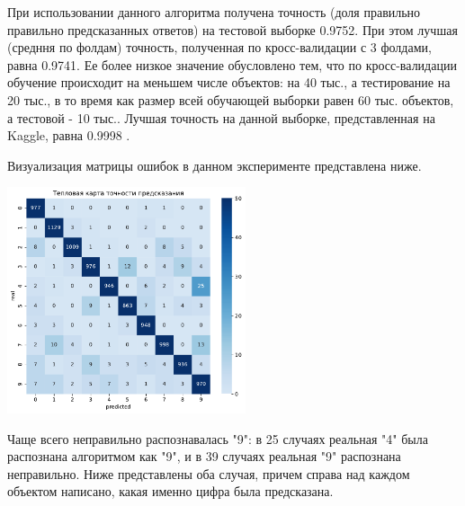 \documentclass{article}
\begin{document}
При использовании данного алгоритма получена точность (доля правильно правильно предсказанных ответов) на тестовой выборке 0.9752. При этом лучшая (средння по фолдам) точность, полученная по кросс-валидации с 3 фолдами, равна 0.9741. Ее более низкое значение обусловлено тем, что по кросс-валидации обучение происходит на меньшем числе объектов: на 40 тыс., а тестирование на 20 тыс., в то время как размер всей обучающей выборки равен 60 тыс. объектов, а тестовой - 10 тыс.. Лучшая точность на данной выборке, представленная на Kaggle, равна 0.9998 \cite{ss2}.

Визуализация матрицы ошибок в данном эксперименте представлена ниже.
\begin{center}
\includegraphics[width=7cm]{TASK1 warm map.pdf}
\end{center}

Чаще всего неправильно распознавалась "9": в 25 случаях реальная "4"{ }была распознана алгоритмом как "9"{}, и в 39 случаях реальная "9"{ }распознана неправильно. Ниже представлены оба случая, причем справа над каждом объектом написано, какая именно цифра была предсказана.
\end{document}

